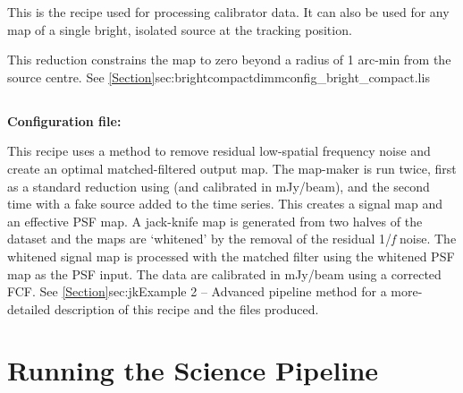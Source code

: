 This is the recipe used for processing calibrator data. It can also
be used for any map of a single bright, isolated source at the
tracking position. 

This reduction constrains the map to zero beyond a radius of 1 arc-min
from the source centre. See \cref{Section}{sec:brightcompact}{dimmconfig\_bright\_compact.lis}


\subsection{}

\textbf{Configuration file: }

This recipe uses a
method to remove residual low-spatial frequency noise and create an
optimal matched-filtered output map. The map-maker is run twice, first
as a standard reduction using  (and
calibrated in mJy/beam), and the second time with a fake source added
to the time series. This creates a signal map and an effective PSF
map. A jack-knife map is generated from two halves of the dataset and
the maps are `whitened' by the removal of the residual 1/\emph{f}
noise. The whitened signal map is processed with the matched filter
using the whitened PSF map as the PSF input. The data are calibrated
in mJy/beam using a corrected FCF.  See \cref{Section}{sec:jk}{Example
  2 -- Advanced pipeline method} for a more-detailed description of
this recipe and the files produced.


\section{Running the Science Pipeline}
\label{sec:plsteps}


